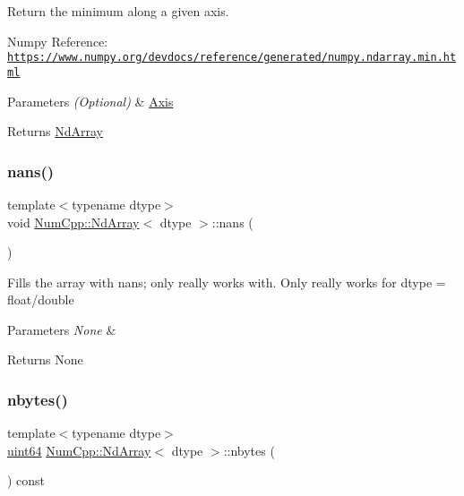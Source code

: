 Return the minimum along a given axis.

Numpy Reference\+: \href{https://www.numpy.org/devdocs/reference/generated/numpy.ndarray.min.html}{\tt https\+://www.\+numpy.\+org/devdocs/reference/generated/numpy.\+ndarray.\+min.\+html}


\begin{DoxyParams}{Parameters}
{\em (\+Optional)} & \mbox{\hyperlink{struct_num_cpp_1_1_axis}{Axis}} \\
\hline
\end{DoxyParams}
\begin{DoxyReturn}{Returns}
\mbox{\hyperlink{class_num_cpp_1_1_nd_array}{Nd\+Array}} 
\end{DoxyReturn}
\mbox{\label{class_num_cpp_1_1_nd_array_a744e2b25b36ddeac6b1495068bf298d6}} 
\subsubsection{\texorpdfstring{nans()}{nans()}}
{\footnotesize\ttfamily template$<$typename dtype$>$ \\
void \mbox{\hyperlink{class_num_cpp_1_1_nd_array}{Num\+Cpp\+::\+Nd\+Array}}$<$ dtype $>$\+::nans (\begin{DoxyParamCaption}{ }\end{DoxyParamCaption})\hspace{0.3cm}{\ttfamily [inline]}}

Fills the array with nans; only really works with. Only really works for dtype = float/double


\begin{DoxyParams}{Parameters}
{\em None} & \\
\hline
\end{DoxyParams}
\begin{DoxyReturn}{Returns}
None 
\end{DoxyReturn}
\mbox{\label{class_num_cpp_1_1_nd_array_a0f15ef17ca8da31ee188b2c20801243c}} 
\subsubsection{\texorpdfstring{nbytes()}{nbytes()}}
{\footnotesize\ttfamily template$<$typename dtype$>$ \\
\mbox{\hyperlink{namespace_num_cpp_a9b8a75722198a622843adfb37b1b2e9d}{uint64}} \mbox{\hyperlink{class_num_cpp_1_1_nd_array}{Num\+Cpp\+::\+Nd\+Array}}$<$ dtype $>$\+::nbytes (\begin{DoxyParamCaption}{ }\end{DoxyParamCaption}) const\hspace{0.3cm}{\ttfamily [inline]}}


